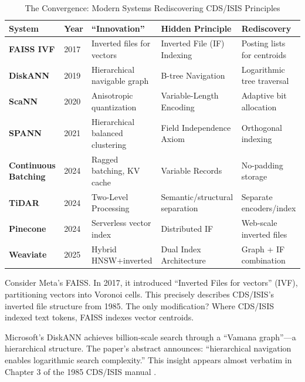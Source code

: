 \documentclass[manuscript,screen,nonacm]{acmart}
\begin{document}
\begin{table}[h]
\centering
\caption{The Convergence: Modern Systems Rediscovering CDS/ISIS Principles}
\label{tab:convergence}
\begin{tabular}{p{} p{} p{} p{} p{}}
\toprule
\textbf{System} & \textbf{Year} & \textbf{``Innovation''} & \textbf{Hidden Principle} & \textbf{Rediscovery} \\
\midrule
\textbf{FAISS IVF} \cite{johnson2017} & 2017 & Inverted files for vectors & Inverted File (IF) Indexing & Posting lists for centroids \\
\textbf{DiskANN} \cite{subramanya2019} & 2019 & Hierarchical navigable graph & B-tree Navigation & Logarithmic tree traversal \\
\textbf{ScaNN} \cite{guo2020} & 2020 & Anisotropic quantization & Variable-Length Encoding & Adaptive bit allocation \\
\textbf{SPANN} \cite{chen2021} & 2021 & Hierarchical balanced clustering & Field Independence Axiom & Orthogonal indexing \\
\textbf{Continuous Batching} \cite{reboul2025} & 2024 & Ragged batching, KV cache & Variable Records & No-padding storage \\
\textbf{TiDAR} \cite{liu2024} & 2024 & Two-Level Processing & Semantic/structural separation & Separate encoders/index \\
\textbf{Pinecone} \cite{pinecone2024} & 2024 & Serverless vector index & Distributed IF & Web-scale inverted files \\
\textbf{Weaviate} \cite{weaviate2025} & 2025 & Hybrid HNSW+inverted & Dual Index Architecture & Graph + IF combination \\
\bottomrule
\end{tabular}
\end{table}

Consider Meta's FAISS. In 2017, it introduced ``Inverted Files for vectors'' (IVF), partitioning vectors into Voronoi cells. This precisely describes CDS/ISIS's inverted file structure from 1985. The only modification? Where CDS/ISIS indexed text tokens, FAISS indexes vector centroids.

Microsoft's DiskANN achieves billion-scale search through a ``Vamana graph''---a hierarchical structure. The paper's abstract announces: ``hierarchical navigation enables logarithmic search complexity.'' This insight appears almost verbatim in Chapter 3 of the 1985 CDS/ISIS manual \cite{unesco1989}.
\end{document}
